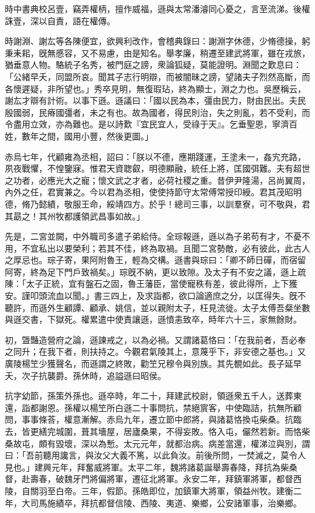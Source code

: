 \begin{pinyinscope}
時中書典校呂壹，竊弄權柄，擅作威福，遜與太常潘濬同心憂之，言至流涕。後權誅壹，深以自責，語在權傳。

時謝淵、謝厷等各陳便宜，欲興利改作，會稽典錄曰：謝淵字休德，少脩德操，躬秉耒耜，旣無慼容，又不易慮，由是知名。舉孝廉，稍遷至建武將軍，雖在戎旅，猶垂意人物。駱統子名秀，被門庭之謗，衆論狐疑，莫能證明。淵聞之歎息曰：「公緒早夭，同盟所哀。聞其子志行明辯，而被闇昧之謗，望諸夫子烈然高斷，而各懷遲疑，非所望也。」秀卒見明，無復瑕玷，終為顯士，淵之力也。吳歷稱云，謝厷才辯有計術。以事下遜。遜議曰：「國以民為本，彊由民力，財由民出。夫民殷國弱，民瘠國彊者，未之有也。故為國者，得民則治，失之則亂，若不受利，而令盡用立效，亦為難也。是以詩歎『宜民宜人，受祿于天』。乞垂聖恩，寧濟百姓，數年之間，國用小豐，然後更圖。」

赤烏七年，代顧雍為丞相，詔曰：「朕以不德，應期踐運，王塗未一，姦宄充路，夙夜戰懼，不惶鑒寐。惟君天資聦叡，明德顯融，統任上將，匡國弭難。夫有超世之功者，必應光大之寵；懷文武之才者，必荷社稷之重。昔伊尹隆湯，呂尚翼周，內外之任，君實兼之。今以君為丞相，使使持節守太常傅常授印綬。君其茂昭明德，脩乃懿績，敬服王命，綏靖四方。於乎！總司三事，以訓羣寮，可不敬與，君其勗之！其州牧都護領武昌事如故。」

先是，二宮並闕，中外職司多遣子弟給侍。全琮報遜，遜以為子弟苟有才，不憂不用，不宜私出以要榮利；若其不佳，終為取禍。且聞二宮勢敵，必有彼此，此古人之厚忌也。琮子寄，果阿附魯王，輕為交構。遜書與琮曰：「卿不師日磾，而宿留阿寄，終為足下門戶致禍矣。」琮旣不納，更以致隙。及太子有不安之議，遜上疏陳：「太子正統，宜有盤石之固，魯王藩臣，當使寵秩有差，彼此得所，上下獲安。謹叩頭流血以聞。」書三四上，及求詣都，欲口論適庶之分，以匡得失。旣不聽許，而遜外生顧譚、顧承、姚信，並以親附太子，枉見流徙。太子太傅吾粲坐數與遜交書，下獄死。權累遣中使責讓遜，遜憤恚致卒，時年六十三，家無餘財。

初，曁豔造營府之論，遜諫戒之，以為必禍。又謂諸葛恪曰：「在我前者，吾必奉之同升；在我下者，則扶持之。今觀君氣陵其上，意蔑乎下，非安德之基也。」又廣陵楊笁少獲聲名，而遜謂之終敗，勸笁兄穆令與別族。其先覩如此。長子延早夭，次子抗襲爵。孫休時，追謚遜曰昭侯。

抗字幼節，孫策外孫也。遜卒時，年二十，拜建武校尉，領遜衆五千人，送葬東還，詣都謝恩。孫權以楊笁所白遜二十事問抗，禁絕賔客，中使臨詰，抗無所顧問，事事條荅，權意漸解。赤烏九年，遷立節中郎將，與諸葛恪換屯柴桑。抗臨去，皆更繕完城圍，葺其墻屋，居廬桑果，不得妄敗。恪入屯，儼然若新。而恪柴桑故屯，頗有毀壞，深以為慙。太元元年，就都治病。病差當還，權涕泣與別，謂曰：「吾前聽用讒言，與汝父大義不篤，以此負汝。前後所問，一焚滅之，莫令人見也。」建興元年，拜奮威將軍。太平二年，魏將諸葛誕舉壽春降，拜抗為柴桑督，赴壽春，破魏牙門將偏將軍，遷征北將軍。永安二年，拜鎮軍將軍，都督西陵，自關羽至白帝。三年，假節。孫皓即位，加鎮軍大將軍，領益州牧。建衡二年，大司馬施績卒，拜抗都督信陵、西陵、夷道、樂鄉，公安諸軍事，治樂鄉。


\end{pinyinscope}
